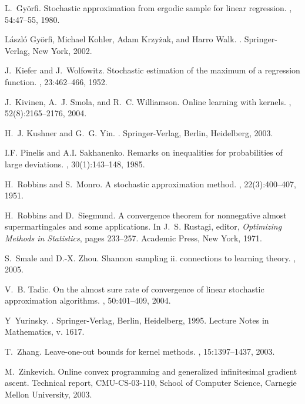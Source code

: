 \documentclass[twoside]{amsart}
\theoremstyle{theorem}
\theoremstyle{definition}
\theoremstyle{remark}
\begin{document}
\begin{thebibliography}{10}
L.~Gy\"{o}rfi.
\newblock Stochastic approximation from ergodic sample for linear regression.
, 54:47--55,
  1980.

L\'{a}szl\'{o} Gy\"{o}rfi, Michael Kohler, Adam Krzy\.{z}ak, and Harro Walk.
.
\newblock Springer-Verlag, New York, 2002.

J.~Kiefer and J.~Wolfowitz.
\newblock Stochastic estimation of the maximum of a regression function.
, 23:462--466, 1952.

J.~Kivinen, A.~J. Smola, and R.~C. Williamson.
\newblock Online learning with kernels.
, 52(8):2165--2176, 2004.

H.~J. Kushner and G.~G. Yin.
.
\newblock Springer-Verlag, Berlin, Heidelberg, 2003.

I.F. Pinelis and A.I. Sakhanenko.
\newblock Remarks on inequalities for probabilities of large deviations.
, 30(1):143--148, 1985.

H.~Robbins and S.~Monro.
\newblock A stochastic approximation method.
, 22(3):400--407, 1951.

H.~Robbins and D.~Siegmund.
\newblock A convergence theorem for nonnegative almost supermartingales and
  some applications.
\newblock In J.~S. Rustagi, editor, {\em Optimizing Methods in Statistics},
  pages 233--257. Academic Press, New York, 1971.

S.~Smale and D.-X. Zhou.
\newblock Shannon sampling ii. connections to learning theory.
, 2005.

V.~B. Tadic.
\newblock On the almost sure rate of convergence of linear stochastic
  approximation algorithms.
, 50:401--409, 2004.

Y~Yurinsky.
.
\newblock Springer-Verlag, Berlin, Heidelberg, 1995.
\newblock Lecture Notes in Mathematics, v. 1617.

T.~Zhang.
\newblock Leave-one-out bounds for kernel methods.
, 15:1397--1437, 2003.

M.~Zinkevich.
\newblock Online convex programming and generalized infinitesimal gradient
  ascent.
\newblock Technical report, CMU-CS-03-110, School of Computer Science, Carnegie
  Mellon University, 2003.

\end{thebibliography}
\end{document}

